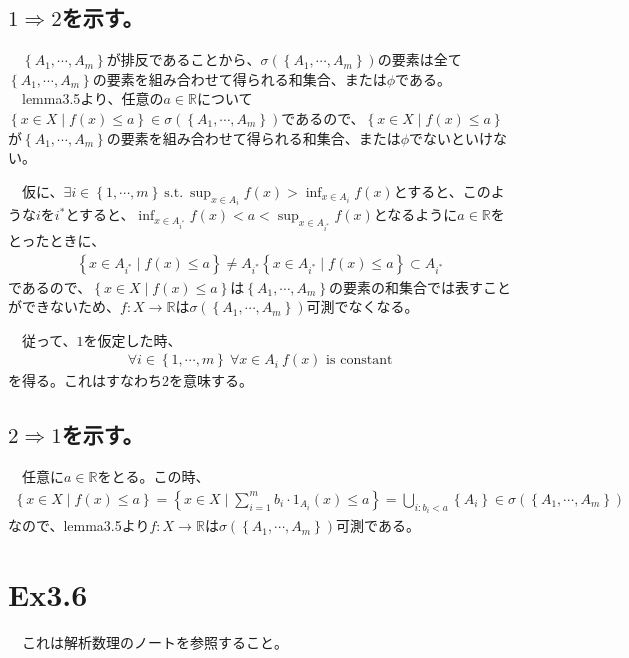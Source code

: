 \documentclass{article}
\begin{document}
\subsection{$1\Rightarrow 2$を示す。}
　$\left\{ A_1, \cdots, A_m\right\}$が排反であることから、$\sigma\left( \left\{ A_1, \cdots, A_m\right\} \right)$の要素は全て$\left\{ A_1, \cdots, A_m\right\}$の要素を組み合わせて得られる和集合、または$\phi$である。
　lemma3.5より、任意の$a\in \mathbb{R}$について$\left\{ x\in X\mid f(x)\leq a \right\} \in \sigma\left( \left\{ A_1, \cdots, A_m\right\} \right)$であるので、$\left\{ x\in X\mid f(x)\leq a \right\}$が$\left\{ A_1, \cdots, A_m\right\}$の要素を組み合わせて得られる和集合、または$\phi$でないといけない。

　仮に、$\exists i\in \left\{ 1,\cdots, m \right\}\ \text{s.t.}\ \sup_{x\in A_i} f(x) > \inf_{x\in A_i} f(x)$とすると、このような$i$を$i^{*}$とすると、$\inf_{x\in A_{i^{*}}} f(x) < a < \sup_{x\in A_{i^{*}}} f(x)$となるように$a\in \mathbb{R}$をとったときに、
\begin{align*}
	\left\{ x\in A_{i^{*}} \mid f(x)\leq a \right\} \neq A_{i^{*}}
	\left\{ x\in A_{i^{*}} \mid f(x)\leq a \right\} \subset A_{i^{*}}
\end{align*}
であるので、$\left\{ x\in X \mid f(x)\leq a \right\}$は$\left\{ A_1, \cdots, A_m\right\}$の要素の和集合では表すことができないため、$f:X\to \mathbb{R}$は$\sigma\left( \left\{ A_1, \cdots, A_m\right\} \right)$可測でなくなる。

　従って、$1$を仮定した時、
\begin{align*}
\forall i\in \left\{ 1, \cdots, m\right\}\ \forall x \in A_i\ f(x) \text{\ is constant}
\end{align*}
を得る。これはすなわち$2$を意味する。

\subsection{$2\Rightarrow 1$を示す。}
　任意に$a\in \mathbb{R}$をとる。この時、
\begin{align*}
	\left\{ x\in X \mid f(x)\leq a \right\}  = \left\{ x\in X \mid \sum_{i=1}^{m} b_i \cdot 1_{A_i}(x) \leq a \right\} = \bigcup_{i:b_i < a} \left\{ A_i \right\} \in \sigma\left( \left\{ A_1, \cdots, A_m\right\} \right)
\end{align*}
なので、lemma3.5より$f:X\to\mathbb{R}$は$\sigma\left( \left\{ A_1, \cdots, A_m\right\} \right)$可測である。

\section{Ex3.6}
　これは解析数理のノートを参照すること。
\end{document}
